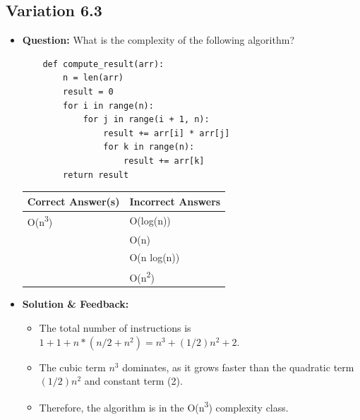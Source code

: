 \subsection{Variation 6.3}
\begin{itemize}
    \item \textbf{Question:} What is the complexity of the following algorithm?
    
    \begin{lstlisting}
    def compute_result(arr):
        n = len(arr)
        result = 0
        for i in range(n):
            for j in range(i + 1, n):
                result += arr[i] * arr[j]
                for k in range(n):
                    result += arr[k]
        return result
    \end{lstlisting}
    
    \begin{tabular}{|l|l|}
        \hline
        \textbf{Correct Answer(s)} & \textbf{Incorrect Answers} \\
        \hline
        O(n\textsuperscript{3}) & O(log(n)) \\
         & O(n) \\
         & O(n log(n)) \\
         & O(n\textsuperscript{2}) \\
        \hline
    \end{tabular}
    
    \item \textbf{Solution \& Feedback:}
    \begin{itemize}
        \item The total number of instructions is \( 1 + 1 + n * (n/2 + n^2) = n^3 + (1/2)n^2 + 2 \).
        \item The cubic term \( n^3 \) dominates, as it grows faster than the quadratic term \((1/2)n^2\) and constant term (2).
        \item Therefore, the algorithm is in the O(n\textsuperscript{3}) complexity class.
    \end{itemize}
\end{itemize}

